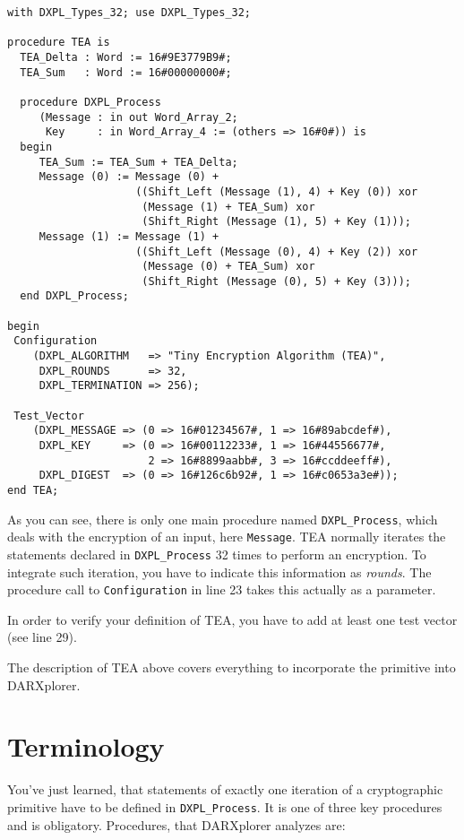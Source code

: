 \documentclass{acmtrans2m}
\begin{document}
\begin{lstlisting}
with DXPL_Types_32; use DXPL_Types_32;

procedure TEA is
  TEA_Delta : Word := 16#9E3779B9#;
  TEA_Sum   : Word := 16#00000000#;

  procedure DXPL_Process
     (Message : in out Word_Array_2;
      Key     : in Word_Array_4 := (others => 16#0#)) is
  begin
     TEA_Sum := TEA_Sum + TEA_Delta;
     Message (0) := Message (0) +
                    ((Shift_Left (Message (1), 4) + Key (0)) xor
                     (Message (1) + TEA_Sum) xor
                     (Shift_Right (Message (1), 5) + Key (1)));
     Message (1) := Message (1) +
                    ((Shift_Left (Message (0), 4) + Key (2)) xor
                     (Message (0) + TEA_Sum) xor
                     (Shift_Right (Message (0), 5) + Key (3)));
  end DXPL_Process;

begin
 Configuration
    (DXPL_ALGORITHM   => "Tiny Encryption Algorithm (TEA)",
     DXPL_ROUNDS      => 32,
     DXPL_TERMINATION => 256);

 Test_Vector
    (DXPL_MESSAGE => (0 => 16#01234567#, 1 => 16#89abcdef#),
     DXPL_KEY     => (0 => 16#00112233#, 1 => 16#44556677#,
                      2 => 16#8899aabb#, 3 => 16#ccddeeff#),
     DXPL_DIGEST  => (0 => 16#126c6b92#, 1 => 16#c0653a3e#));
end TEA;
\end{lstlisting}

As you can see, there is only one main procedure named \texttt{DXPL\_Process}, 
which deals with the encryption of an input, here \texttt{Message}. TEA
normally iterates the statements declared in \texttt{DXPL\_Process} 32 times
to perform an encryption. To integrate such iteration, you have to indicate
this information as \textit{rounds}. The procedure call to \texttt{Configuration} 
in line 23 takes this actually as a parameter.

In order to verify your definition of TEA, you have to add at least one test 
vector (see line 29).

The description of TEA above covers everything to incorporate the primitive
into DARXplorer.

\section{Terminology}
You've just learned, that statements of exactly one iteration of a cryptographic
primitive have to be defined in \texttt{DXPL\_Process}. It is one of three key
procedures and is obligatory. Procedures, that DARXplorer analyzes are:
\end{document}
